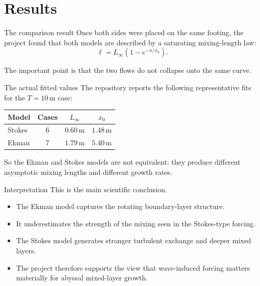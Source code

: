 \documentclass[11pt]{beamer}
\begin{document}
\section{Results}

\begin{frame}{The comparison result}
    Once both sides were placed on the same footing, the project found that both models are described by a saturating mixing-length law:
    \[
    \ell = L_\infty\left(1-e^{-x/x_0}\right).
    \]

    The important point is that the two flows do not collapse onto the same curve.
\end{frame}

\begin{frame}{The actual fitted values}
    The repository reports the following representative fits for the $T=10\,\mathrm{m}$ case:

    \begin{table}
        \centering
        \begin{tabular}{lccc}
            \hline
            Model & Cases & $L_\infty$ & $x_0$ \\
            \hline
            Stokes & 6 & $0.60\,\mathrm{m}$ & $1.48\,\mathrm{m}$ \\
            Ekman & 7 & $1.79\,\mathrm{m}$ & $5.40\,\mathrm{m}$ \\
            \hline
        \end{tabular}
    \end{table}

    So the Ekman and Stokes models are not equivalent: they produce different asymptotic mixing lengths and different growth rates.
\end{frame}

\begin{frame}{Interpretation}
    This is the main scientific conclusion.

    \begin{itemize}
        \item The Ekman model captures the rotating boundary-layer structure.
        \item It underestimates the strength of the mixing seen in the Stokes-type forcing.
        \item The Stokes model generates stronger turbulent exchange and deeper mixed layers.
        \item The project therefore supports the view that wave-induced forcing matters materially for abyssal mixed-layer growth.
    \end{itemize}
\end{frame}
\end{document}
